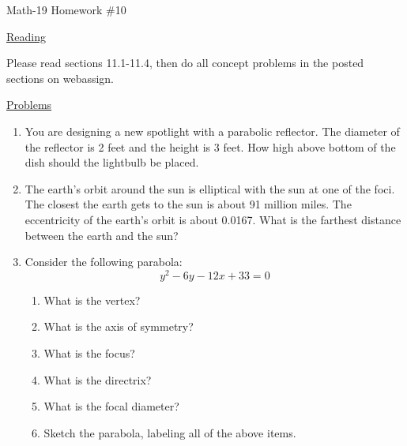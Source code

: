 \documentclass[letterpaper,12pt,fleqn]{article}
\begin{document}
\begin{center}
\Large Math-19 Homework \#10
\end{center}

\vspace{0.5in}

\underline{Reading}

Please read sections 11.1-11.4, then do all concept problems in the posted
sections on web\-assign.

\underline{Problems}

\begin{enumerate}
\item You are designing a new spotlight with a parabolic reflector. The
  diameter of the reflector is 2 feet and the height is 3 feet. How high above
  bottom of the dish should the lightbulb be placed.

\item The earth's orbit around the sun is elliptical with the sun at one of
  the foci. The closest the earth gets to the sun is about 91 million miles.
  The eccentricity of the earth's orbit is about 0.0167. What is the farthest
  distance between the earth and the sun?

\item Consider the following parabola:
  \[y^2-6y-12x+33=0\]
  \begin{enumerate}
  \item What is the vertex?
  \item What is the axis of symmetry?
  \item What is the focus?
  \item What is the directrix?
  \item What is the focal diameter?
  \item Sketch the parabola, labeling all of the above items.
  \end{enumerate}


\end{enumerate}
\end{document}
